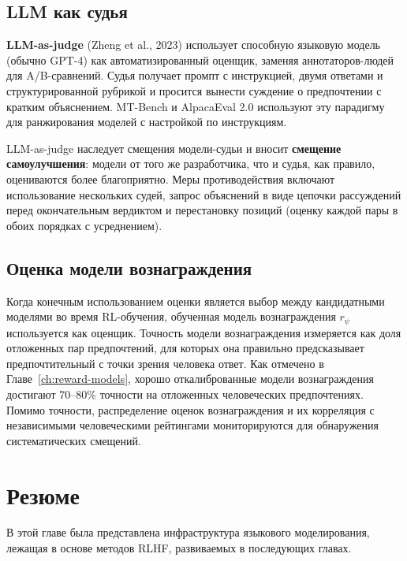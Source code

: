 \subsection{LLM как судья}

\textbf{LLM-as-judge} (Zheng et al., 2023) использует способную языковую модель (обычно GPT-4) как автоматизированный оценщик, заменяя аннотаторов-людей для A/B-сравнений. Судья получает промпт с инструкцией, двумя ответами и структурированной рубрикой и просится вынести суждение о предпочтении с кратким объяснением. MT-Bench и AlpacaEval 2.0 используют эту парадигму для ранжирования моделей с настройкой по инструкциям.

LLM-as-judge наследует смещения модели-судьи и вносит \textbf{смещение самоулучшения}: модели от того же разработчика, что и судья, как правило, оцениваются более благоприятно. Меры противодействия включают использование нескольких судей, запрос объяснений в виде цепочки рассуждений перед окончательным вердиктом и перестановку позиций (оценку каждой пары в обоих порядках с усреднением).

\subsection{Оценка модели вознаграждения}

Когда конечным использованием оценки является выбор между кандидатными моделями во время RL-обучения, обученная модель вознаграждения $r_\psi$ используется как оценщик. Точность модели вознаграждения измеряется как доля отложенных пар предпочтений, для которых она правильно предсказывает предпочтительный с точки зрения человека ответ. Как отмечено в Главе~\ref{ch:reward-models}, хорошо откалиброванные модели вознаграждения достигают 70--80\% точности на отложенных человеческих предпочтениях. Помимо точности, распределение оценок вознаграждения и их корреляция с независимыми человеческими рейтингами мониторируются для обнаружения систематических смещений.

\section{Резюме}
\label{sec:lm-summary}

В этой главе была представлена инфраструктура языкового моделирования, лежащая в основе методов RLHF, развиваемых в последующих главах.

